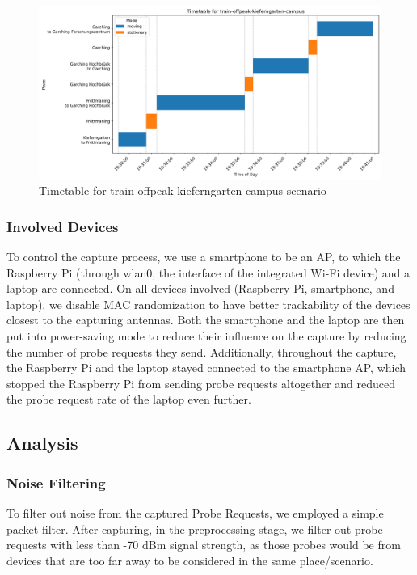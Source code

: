 \documentclass[sigconf,nonacm]{acmart}
\begin{document}
\begin{figure}
    \centering
    \includegraphics[width=\columnwidth]{images/part1/timetables/timetable-train-offpeak-kieferngarten-campus.png}
    \caption{Timetable for train-offpeak-kieferngarten-campus scenario}
    \label{fig:timetable-train-offpeak-kieferngarten-campus}
\end{figure}

\subsubsection{Involved Devices}
\label{sec:part-1/da-co/devices}
To control the capture process, we use a smartphone to be an AP, to which the Raspberry Pi (through wlan0, the interface of the integrated Wi-Fi device) and a laptop are connected. On all devices involved (Raspberry Pi, smartphone, and laptop), we disable MAC randomization to have better trackability of the devices closest to the capturing antennas. Both the smartphone and the laptop are then put into power-saving mode to reduce their influence on the capture by reducing the number of probe requests they send. Additionally, throughout the capture, the Raspberry Pi and the laptop stayed connected to the smartphone AP, which stopped the Raspberry Pi from sending probe requests altogether and reduced the probe request rate of the laptop even further.

\subsection{Analysis}
\label{sec:part-1/ana}


\subsubsection{Noise Filtering}
\label{sec:part-1/ana/noise-filtering}
To filter out noise from the captured Probe Requests, we employed a simple packet filter. After capturing, in the preprocessing stage, we filter out probe requests with less than -70 dBm signal strength, as those probes would be from devices that are too far away to be considered in the same place/scenario.
\end{document}
